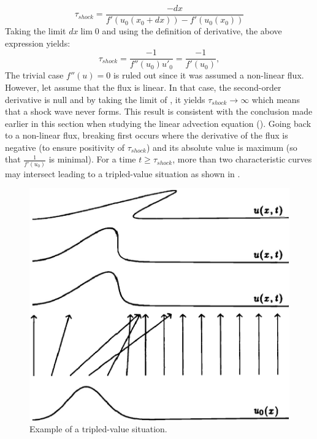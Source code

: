 \begin{equation}
\tau_{shock} = \frac{-dx}{f'(u_0(x_0+dx))-f'(u_0(x_0))}
\end{equation} 
Taking the limit $dx \lim 0$ and using the definition of derivative, the above expression yields:
\begin{equation}\label{eq:cc2_sct1b}
\tau_{shock} = \frac{-1}{f''(u_0) u'_0} = \frac{-1}{f'(u_0)},
\end{equation} 
The trivial case $f''(u) = 0$ is ruled out since it was assumed a non-linear flux. However, let assume that the flux is linear. In that case, the second-order derivative is null and by taking the limit of , it yields $\tau_{shock} \to \infty$ which means that a shock wave never forms. This result is consistent with the conclusion made earlier in this section when studying the linear advection equation (). Going back to a non-linear flux, breaking first occurs where the derivative of the flux is negative (to ensure positivity of $\tau_{shock}$) and its absolute value is maximum (so that $\frac{1}{f'(u_0)}$ is minimal). For a time $t \geq \tau_{shock}$, more than two characteristic curves may intersect leading to a tripled-value situation as shown in . 
%
\begin{figure}[H]
\centering
\includegraphics[width=\textwidth]{figures/charact_curves_burger.png}
\caption{Example of a tripled-value situation.}
\label{fig:triple_pt_bg_sct1b}
\end{figure}

